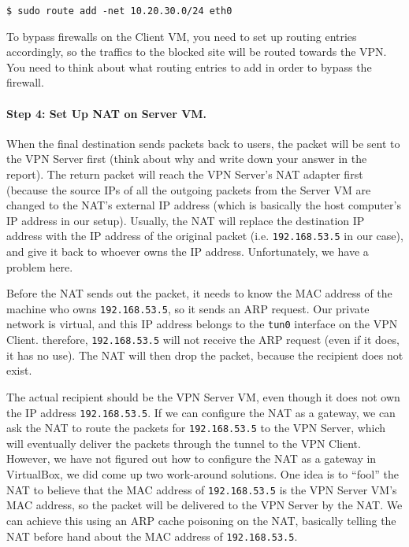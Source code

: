 \begin{lstlisting}
$ sudo route add -net 10.20.30.0/24 eth0
\end{lstlisting}

To bypass firewalls on the Client VM, you need to set up 
routing entries accordingly, so the traffics to the blocked site
will be routed towards the VPN. You need to think about what 
routing entries to add in order to bypass the firewall. 



\paragraph{Step 4: Set Up NAT on Server VM.}
When the final destination sends packets back to users, the packet
will be sent to the VPN Server first (think about why and write down your answer 
in the report). The return packet will reach the VPN Server's NAT
adapter first (because the source IPs of all  the outgoing
packets from the Server VM are changed to the NAT's external IP address (which is basically the host computer's IP
address in our setup). Usually, the NAT will replace the destination IP address with the IP
address of the original packet (i.e. \texttt{192.168.53.5} in our case), and give it back to whoever owns
the IP address.  Unfortunately, we have a problem here.


Before the NAT sends out the packet, it needs to know the MAC address of the machine who owns
\texttt{192.168.53.5}, so it sends an ARP request. Our private network is virtual, and 
this IP address belongs to the \texttt{tun0} interface on the VPN Client.  
therefore, \texttt{192.168.53.5} will not receive the ARP request (even if it does, it has no
use). The NAT will then drop the packet, because the recipient does not exist.


The actual recipient should be the VPN Server VM, even though it does not own the IP address 
\texttt{192.168.53.5}.  If
we can configure the NAT as a gateway, we can ask the NAT to route the packets for
\texttt{192.168.53.5} to 
the VPN Server, which will eventually deliver the packets through the tunnel to the VPN Client. However,
we have not figured out how to configure the NAT as a gateway in VirtualBox, we did
come up two work-around solutions. One idea is to ``fool'' the NAT to believe that the MAC address of
\texttt{192.168.53.5} is the VPN Server VM's MAC address, so the packet will be delivered to
the VPN Server by the NAT. We can achieve this using an ARP cache poisoning on the NAT, basically telling the
NAT before hand about the MAC address of \texttt{192.168.53.5}.

